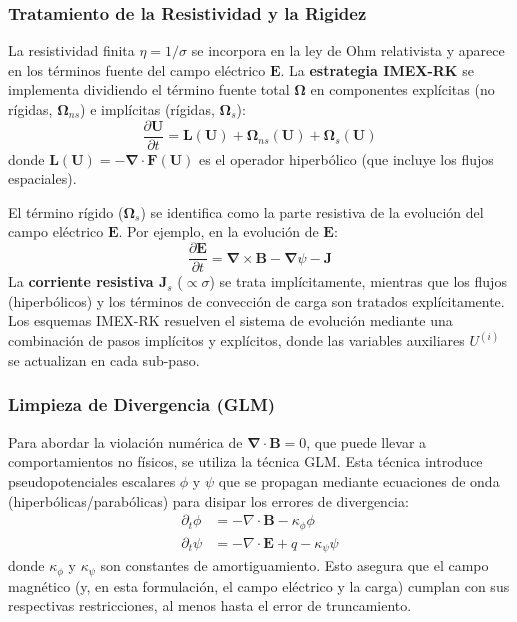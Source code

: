 \subsubsection{Tratamiento de la Resistividad y la Rigidez}
La resistividad finita $\eta = 1/\sigma$ se incorpora en la ley de Ohm relativista y aparece en los términos fuente del campo eléctrico $\mathbf{E}$. La \textbf{estrategia IMEX-RK} se implementa dividiendo el término fuente total $\mathbf{\Omega}$ en componentes explícitas (no rígidas, $\mathbf{\Omega}_{ns}$) e implícitas (rígidas, $\mathbf{\Omega}_s$):
\begin{equation}
\label{eq:IMEX_split}
\frac{\partial \mathbf{U}}{\partial t} = \mathbf{L}(\mathbf{U}) + \mathbf{\Omega}_{ns}(\mathbf{U}) + \mathbf{\Omega}_s(\mathbf{U})
\end{equation}
donde $\mathbf{L}(\mathbf{U}) = -\mathbf{\nabla} \cdot \mathbf{F}(\mathbf{U})$ es el operador hiperbólico (que incluye los flujos espaciales).

El término rígido ($\mathbf{\Omega}_s$) se identifica como la parte resistiva de la evolución del campo eléctrico $\mathbf{E}$. Por ejemplo, en la evolución de $\mathbf{E}$:
\begin{equation}
\frac{\partial \mathbf{E}}{\partial t} = \mathbf{\nabla} \times \mathbf{B} - \mathbf{\nabla}\psi - \mathbf{J}
\end{equation}
La \textbf{corriente resistiva $\mathbf{J}_s$} ($\propto \sigma$) se trata implícitamente, mientras que los flujos (hiperbólicos) y los términos de convección de carga son tratados explícitamente. Los esquemas IMEX-RK resuelven el sistema de evolución mediante una combinación de pasos implícitos y explícitos, donde las variables auxiliares $U^{(i)}$ se actualizan en cada sub-paso.

\subsubsection{Limpieza de Divergencia (GLM)}
Para abordar la violación numérica de $\mathbf{\nabla} \cdot \mathbf{B} = 0$, que puede llevar a comportamientos no físicos, se utiliza la técnica GLM. Esta técnica introduce pseudopotenciales escalares $\phi$ y $\psi$ que se propagan mediante ecuaciones de onda (hiperbólicas/parabólicas) para disipar los errores de divergencia:
\begin{align}
\partial_t \phi &= -\nabla \cdot \mathbf{B} - \kappa_\phi \phi \\
\partial_t \psi &= -\nabla \cdot \mathbf{E} + q - \kappa_\psi \psi
\end{align}
donde $\kappa_\phi$ y $\kappa_\psi$ son constantes de amortiguamiento. Esto asegura que el campo magnético (y, en esta formulación, el campo eléctrico y la carga) cumplan con sus respectivas restricciones, al menos hasta el error de truncamiento.

